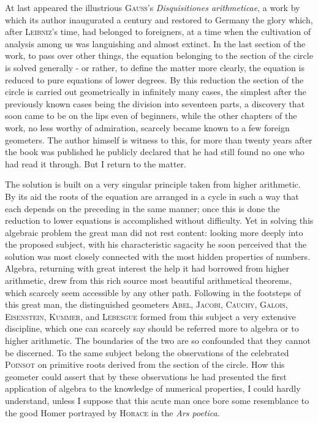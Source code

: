 \documentclass[11pt]{article}
\newcommand{\scn}[1]{\textsc{#1}}
\begin{document}
At last appeared the illustrious \scn{Gauss}'s \emph{Disquisitiones arithmeticae}, a work by which its author inaugurated a century and restored to Germany the glory which, after \scn{Leibniz}'s time, had belonged to foreigners, at a time when the cultivation of analysis among us was languishing and almost extinct. In the last section of the work, to pass over other things, the equation belonging to the section of the circle is solved generally - or rather, to define the matter more clearly, the equation is reduced to pure equations of lower degrees. By this reduction the section of the circle is carried out geometrically in infinitely many cases, the simplest after the previously known cases being the division into seventeen parts, a discovery that soon came to be on the lips even of beginners, while the other chapters of the work, no less worthy of admiration, scarcely became known to a few foreign geometers. The author himself is witness to this, for more than twenty years after the book was published he publicly declared that he had still found no one who had read it through. But I return to the matter.

The solution is built on a very singular principle taken from higher arithmetic. By its aid the roots of the equation are arranged in a cycle in such a way that each depends on the preceding in the same manner; once this is done the reduction to lower equations is accomplished without difficulty. Yet in solving this algebraic problem the great man did not rest content: looking more deeply into the proposed subject, with his characteristic sagacity he soon perceived that the solution was most closely connected with the most hidden properties of numbers. Algebra, returning with great interest the help it had borrowed from higher arithmetic, drew from this rich source most beautiful arithmetical theorems, which scarcely seem accessible by any other path. Following in the footsteps of this great man, the distinguished geometers \scn{Abel}, \scn{Jacobi}, \scn{Cauchy}, \scn{Galois}, \scn{Eisenstein}, \scn{Kummer}, and \scn{Lebesgue} formed from this subject a very extensive discipline, which one can scarcely say should be referred more to algebra or to higher arithmetic. The boundaries of the two are so confounded that they cannot be discerned. To the same subject belong the observations of the celebrated \scn{Poinsot} on primitive roots derived from the section of the circle. How this geometer could assert that by these observations he had presented the first application of algebra to the knowledge of numerical properties, I could hardly understand, unless I suppose that this acute man once bore some resemblance to the good Homer portrayed by \scn{Horace} in the \emph{Ars poetica}.
\end{document}
